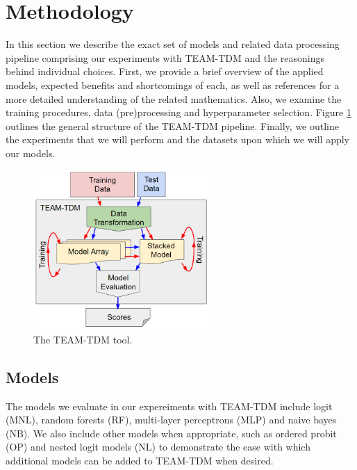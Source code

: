 \documentclass[numbered]{trbunofficial}
\begin{document}
\section{Methodology} \label{section:methodology}

In this section we describe the exact set of models and related data processing pipeline comprising our experiments with TEAM-TDM and the reasonings behind individual choices.
 First, we provide a brief overview of the applied models, expected benefits and shortcomings of each, as well as references for a more detailed understanding of the related mathematics.
 Also, we examine the training procedures, data (pre)processing and hyperparameter selection.
 Figure \ref{fig:flowchart} outlines the general structure of the TEAM-TDM pipeline.
 Finally, we outline the experiments that we will perform and the datasets upon which we will apply our models.

\begin{figure}[!ht]
  \centering
  \includegraphics[width=0.6\textwidth]{flowchart}
  \caption{The TEAM-TDM tool.}\label{fig:flowchart}
\end{figure}

\subsection{Models} \label{subsection:models}

The models we evaluate in our expereiments with TEAM-TDM include logit (MNL), random forests (RF), multi-layer perceptrons (MLP) and naive bayes (NB).
 We also include other models when appropriate, such as ordered probit (OP) and nested logit models (NL) to demonstrate the ease with which additional models can be added to TEAM-TDM when desired.
\end{document}
